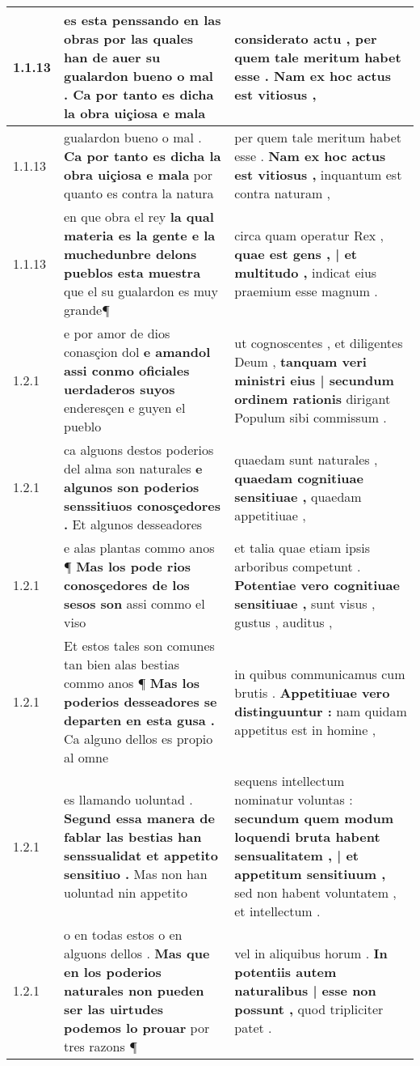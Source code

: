 \begin{tabular}{|p{1cm}|p{6.5cm}|p{6.5cm}|}
1.1.13 & es esta penssando en las obras por las quales han de auer su \textbf{ gualardon bueno o mal . } Ca por tanto es dicha la obra uiçiosa e mala & considerato actu , \textbf{ per quem tale meritum habet esse . } Nam ex hoc actus est vitiosus , \\\hline
1.1.13 & gualardon bueno o mal . \textbf{ Ca por tanto es dicha la obra uiçiosa e mala } por quanto es contra la natura & per quem tale meritum habet esse . \textbf{ Nam ex hoc actus est vitiosus , } inquantum est contra naturam , \\\hline
1.1.13 & en que obra el rey \textbf{ la qual materia es la gente e la muchedunbre delons pueblos esta muestra } que el su gualardon es muy grande¶ & circa quam operatur Rex , \textbf{ quae est gens , | et multitudo , } indicat eius praemium esse magnum . \\\hline
1.2.1 & e por amor de dios conasçion dol \textbf{ e amandol assi conmo oficiales uerdaderos suyos } enderesçen e guyen el pueblo & ut cognoscentes , et diligentes Deum , \textbf{ tanquam veri ministri eius | secundum ordinem rationis } dirigant Populum sibi commissum . \\\hline
1.2.1 & ca alguons destos poderios del alma son naturales \textbf{ e algunos son poderios senssitiuos conosçedores . } Et algunos desseadores & quaedam sunt naturales , \textbf{ quaedam cognitiuae sensitiuae , } quaedam appetitiuae , \\\hline
1.2.1 & e alas plantas commo anos ¶ \textbf{ Mas los pode rios conosçedores de los sesos son } assi commo el viso & et talia quae etiam ipsis arboribus competunt . \textbf{ Potentiae vero cognitiuae sensitiuae , } sunt visus , gustus , auditus , \\\hline
1.2.1 & Et estos tales son comunes tan bien alas bestias commo anos ¶ \textbf{ Mas los poderios desseadores se departen en esta gusa . } Ca alguno dellos es propio al omne & in quibus communicamus cum brutis . \textbf{ Appetitiuae vero distinguuntur : } nam quidam appetitus est in homine , \\\hline
1.2.1 & es llamando uoluntad . \textbf{ Segund essa manera de fablar las bestias han senssualidat et appetito sensitiuo . } Mas non han uoluntad nin appetito & sequens intellectum nominatur voluntas : \textbf{ secundum quem modum loquendi bruta habent sensualitatem , | et appetitum sensitiuum , } sed non habent voluntatem , et intellectum . \\\hline
1.2.1 & o en todas estos o en alguons dellos . \textbf{ Mas que en los poderios naturales non pueden ser las uirtudes podemos lo prouar } por tres razons ¶ & vel in aliquibus horum . \textbf{ In potentiis autem naturalibus | esse non possunt , } quod tripliciter patet . \\\hline

\end{tabular}
